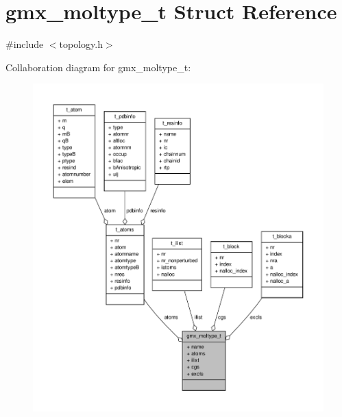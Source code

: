 \hypertarget{structgmx__moltype__t}{\section{gmx\-\_\-moltype\-\_\-t \-Struct \-Reference}
\label{structgmx__moltype__t}
}


{\ttfamily \#include $<$topology.\-h$>$}



\-Collaboration diagram for gmx\-\_\-moltype\-\_\-t\-:
\nopagebreak
\begin{figure}[H]
\begin{center}
\leavevmode
\includegraphics[width=350pt]{structgmx__moltype__t__coll__graph}
\end{center}
\end{figure}

